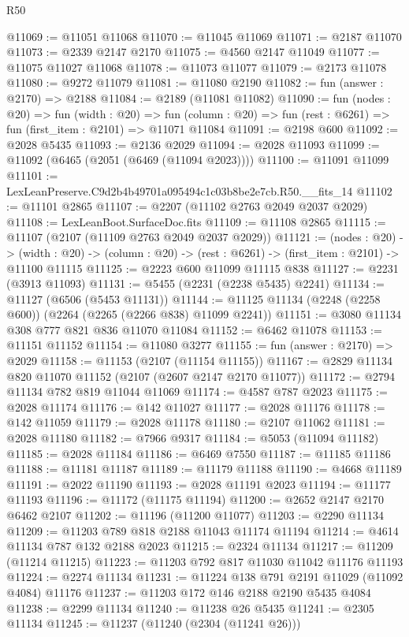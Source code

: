 \begin{lexlean}{R50}
\begin{coremodule}
@11069 := @11051 @11068
@11070 := @11045 @11069
@11071 := @2187 @11070
@11073 := @2339 @2147 @2170
@11075 := @4560 @2147 @11049
@11077 := @11075 @11027 @11068
@11078 := @11073 @11077
@11079 := @2173 @11078
@11080 := @9272 @11079
@11081 := @11080 @2190
@11082 := fun (answer : @2170) => @2188
@11084 := @2189 (@11081 @11082)
@11090 := fun (nodes : @20) =>
  fun (width : @20) =>
  fun (column : @20) => fun (rest : @6261) => fun (first_item : @2101) => @11071 @11084
@11091 := @2198 @600
@11092 := @2028 @5435
@11093 := @2136 @2029
@11094 := @2028 @11093
@11099 := @11092 (@6465 (@2051 (@6469 (@11094 @2023))))
@11100 := @11091 @11099
@11101 := LexLeanPreserve.C9d2b4b49701a095494c1c03b8be2e7cb.R50.__fits_14
@11102 := @11101 @2865
@11107 := @2207 (@11102 @2763 @2049 @2037 @2029)
@11108 := LexLeanBoot.SurfaceDoc.fits
@11109 := @11108 @2865
@11115 := @11107 (@2107 (@11109 @2763 @2049 @2037 @2029))
@11121 := (nodes : @20) ->
  (width : @20) -> (column : @20) -> (rest : @6261) -> (first_item : @2101) -> @11100 @11115
@11125 := @2223 @600 @11099 @11115 @838
@11127 := @2231 (@3913 @11093)
@11131 := @5455 (@2231 (@2238 @5435) @2241)
@11134 := @11127 (@6506 (@5453 @11131))
@11144 := @11125 @11134 (@2248 (@2258 @600)) (@2264 (@2265 (@2266 @838) @11099 @2241))
@11151 := @3080 @11134 @308 @777 @821 @836 @11070 @11084
@11152 := @6462 @11078
@11153 := @11151 @11152
@11154 := @11080 @3277
@11155 := fun (answer : @2170) => @2029
@11158 := @11153 (@2107 (@11154 @11155))
@11167 := @2829 @11134 @820 @11070 @11152 (@2107 (@2607 @2147 @2170 @11077))
@11172 := @2794 @11134 @782 @819 @11044 @11069
@11174 := @4587 @787 @2023
@11175 := @2028 @11174
@11176 := @142 @11027
@11177 := @2028 @11176
@11178 := @142 @11059
@11179 := @2028 @11178
@11180 := @2107 @11062
@11181 := @2028 @11180
@11182 := @7966 @9317
@11184 := @5053 (@11094 @11182)
@11185 := @2028 @11184
@11186 := @6469 @7550
@11187 := @11185 @11186
@11188 := @11181 @11187
@11189 := @11179 @11188
@11190 := @4668 @11189
@11191 := @2022 @11190
@11193 := @2028 @11191 @2023
@11194 := @11177 @11193
@11196 := @11172 (@11175 @11194)
@11200 := @2652 @2147 @2170 @6462 @2107
@11202 := @11196 (@11200 @11077)
@11203 := @2290 @11134
@11209 := @11203 @789 @818 @2188 @11043 @11174 @11194
@11214 := @4614 @11134 @787 @132 @2188 @2023
@11215 := @2324 @11134
@11217 := @11209 (@11214 @11215)
@11223 := @11203 @792 @817 @11030 @11042 @11176 @11193
@11224 := @2274 @11134
@11231 := @11224 @138 @791 @2191 @11029 (@11092 @4084) @11176
@11237 := @11203 @172 @146 @2188 @2190 @5435 @4084
@11238 := @2299 @11134
@11240 := @11238 @26 @5435
@11241 := @2305 @11134
@11245 := @11237 (@11240 (@2304 (@11241 @26)))

\end{coremodule}
\end{lexlean}
